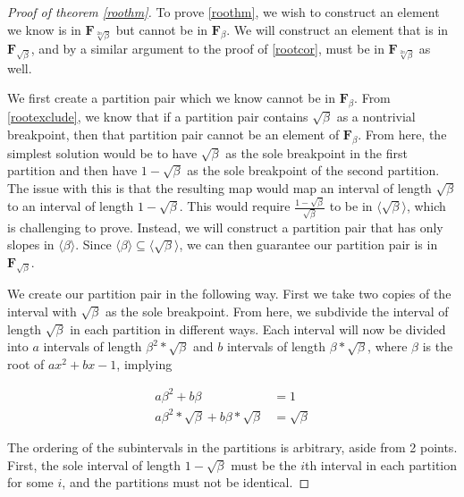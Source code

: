 \documentclass[
11pt, %
english, %
singlespacing, %
parskip, %
headsepline, %
]{amsart} %
\theoremstyle{definition}
\newcommand{\FN}[1]{$\textbf{F}_{#1}$}
\begin{document}
\begin{proof}[Proof of theorem \ref{roothm}]
To prove \ref{roothm}, we wish to construct an element we know is in \FN{\sqrt[2n]{\beta}} but cannot be in \FN{\beta}. We will construct an element that is in \FN{\sqrt{\beta}}, and by a similar argument to the proof of \ref{rootcor}, must be in \FN{\sqrt[2n]{\beta}} as well.
\par
We first create a partition pair which we know cannot be in \FN{\beta}. From \ref{rootexclude}, we know that if a partition pair contains $\sqrt{\beta}$ as a nontrivial breakpoint, then that partition pair cannot be an element of \FN{\beta}. From here, the simplest solution would be to have $\sqrt{\beta}$ as the sole breakpoint in the first partition and then have $1-\sqrt{\beta}$ as the sole breakpoint of the second partition. The issue with this is that the resulting map would map an interval of length $\sqrt{\beta}$ to an interval of length $1-\sqrt{\beta}$. This would require $\frac{1-\sqrt{\beta}}{\sqrt{\beta}}$ to be in $\langle \sqrt{\beta} \rangle$, which is challenging to prove. Instead, we will construct a partition pair that has only slopes in $\langle \beta \rangle$. Since $\langle \beta \rangle \subseteq \langle \sqrt{\beta} \rangle$, we can then guarantee our partition pair is in \FN{\sqrt{\beta}}.
\par
We create our partition pair in the following way. First we take two copies of the interval with $\sqrt{\beta}$ as the sole breakpoint. From here, we subdivide the interval of length $\sqrt{\beta}$ in each partition in different ways. Each interval will now be divided into $a$ intervals of length $\beta^2 * \sqrt{\beta}$ and $b$ intervals of length $\beta * \sqrt{\beta}$, where $\beta$ is the root of $ax^2+bx-1$, implying 

\begin{equation}
\begin{aligned}
a \beta^2 + b \beta & = 1 \\
a \beta^2 *\sqrt{\beta} + b \beta * \sqrt{\beta} & = \sqrt{\beta}
\end{aligned}
\end{equation}
\par
The ordering of the subintervals in the partitions is arbitrary, aside from 2 points. First, the sole interval of length $1-\sqrt{\beta}$ must be the $i$th interval in each partition for some $i$, and the partitions must not be identical. 


\end{proof}
\end{document}
